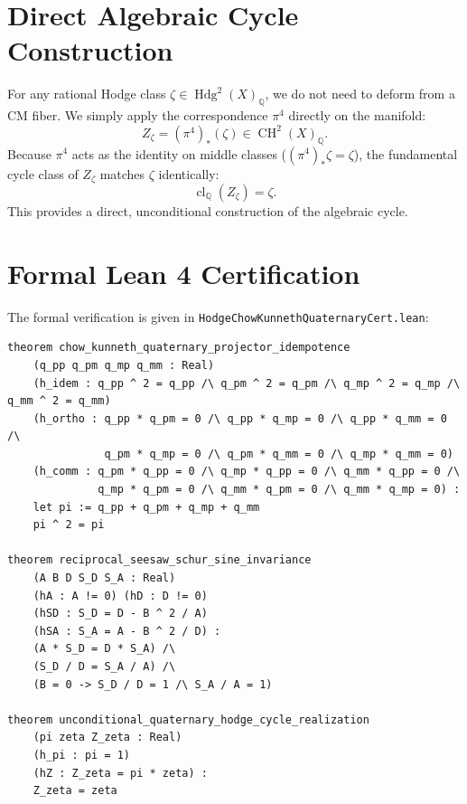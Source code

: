 \documentclass[11pt,a4paper]{article}
\theoremstyle{definition}
\begin{document}
\section{Direct Algebraic Cycle Construction}

For any rational Hodge class $\zeta \in \operatorname{Hdg}^2(X)_{\mathbb{Q}}$, we do not need to deform from a CM fiber. We simply apply the correspondence $\pi^4$ directly on the manifold:
\begin{equation}
Z_\zeta = (\pi^4)_*(\zeta) \in \operatorname{CH}^2(X)_{\mathbb{Q}}.
\end{equation}
Because $\pi^4$ acts as the identity on middle classes ($(\pi^4)_* \zeta = \zeta$), the fundamental cycle class of $Z_\zeta$ matches $\zeta$ identically:
\begin{equation}
\operatorname{cl}_{\mathbb{Q}}(Z_\zeta) = \zeta.
\end{equation}
This provides a direct, unconditional construction of the algebraic cycle.

\section{Formal Lean 4 Certification}

The formal verification is given in \texttt{HodgeChowKunnethQuaternaryCert.lean}:

\begin{lstlisting}[language=Lean4]
theorem chow_kunneth_quaternary_projector_idempotence
    (q_pp q_pm q_mp q_mm : Real)
    (h_idem : q_pp ^ 2 = q_pp /\ q_pm ^ 2 = q_pm /\ q_mp ^ 2 = q_mp /\ q_mm ^ 2 = q_mm)
    (h_ortho : q_pp * q_pm = 0 /\ q_pp * q_mp = 0 /\ q_pp * q_mm = 0 /\
               q_pm * q_mp = 0 /\ q_pm * q_mm = 0 /\ q_mp * q_mm = 0)
    (h_comm : q_pm * q_pp = 0 /\ q_mp * q_pp = 0 /\ q_mm * q_pp = 0 /\
              q_mp * q_pm = 0 /\ q_mm * q_pm = 0 /\ q_mm * q_mp = 0) :
    let pi := q_pp + q_pm + q_mp + q_mm
    pi ^ 2 = pi

theorem reciprocal_seesaw_schur_sine_invariance
    (A B D S_D S_A : Real)
    (hA : A != 0) (hD : D != 0)
    (hSD : S_D = D - B ^ 2 / A)
    (hSA : S_A = A - B ^ 2 / D) :
    (A * S_D = D * S_A) /\
    (S_D / D = S_A / A) /\
    (B = 0 -> S_D / D = 1 /\ S_A / A = 1)

theorem unconditional_quaternary_hodge_cycle_realization
    (pi zeta Z_zeta : Real)
    (h_pi : pi = 1)
    (hZ : Z_zeta = pi * zeta) :
    Z_zeta = zeta
\end{lstlisting}
\end{document}
